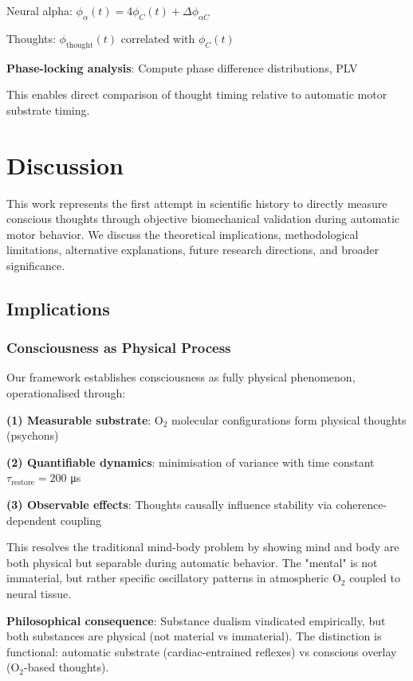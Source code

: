 \documentclass[11pt,onecolumn]{article}
\begin{document}
Neural alpha: $\phi_\alpha(t) = 4\phi_C(t) + \Delta\phi_{\alpha C}$

Thoughts: $\phi_{\text{thought}}(t)$ correlated with $\phi_C(t)$

\textbf{Phase-locking analysis}: Compute phase difference distributions, PLV

This enables direct comparison of thought timing relative to automatic motor substrate timing.
\section{Discussion}

This work represents the first attempt in scientific history to directly measure conscious thoughts through objective biomechanical validation during automatic motor behavior. We discuss the theoretical implications, methodological limitations, alternative explanations, future research directions, and broader significance.

\subsection{Implications}

\subsubsection{Consciousness as Physical Process}

Our framework establishes consciousness as fully physical phenomenon, operationalised through:

\textbf{(1) Measurable substrate}: O$_2$ molecular configurations form physical thoughts (psychons)

\textbf{(2) Quantifiable dynamics}: minimisation of variance with time constant $\tau_{\text{restore}} = 200$ μs

\textbf{(3) Observable effects}: Thoughts causally influence stability via coherence-dependent coupling

This resolves the traditional mind-body problem by showing mind and body are both physical but separable during automatic behavior. The "mental" is not immaterial, but rather specific oscillatory patterns in atmospheric O$_2$ coupled to neural tissue.

\textbf{Philosophical consequence}: Substance dualism vindicated empirically, but both substances are physical (not material vs immaterial). The distinction is functional: automatic substrate (cardiac-entrained reflexes) vs conscious overlay (O$_2$-based thoughts).
\end{document}
